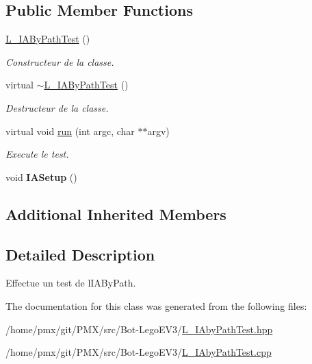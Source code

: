 \subsection*{Public Member Functions}
\begin{DoxyCompactItemize}
\item 
\mbox{\label{classL__IAByPathTest_a1ecc1a354c9182f2080409dbae4d6a03}} 
\hyperlink{classL__IAByPathTest_a1ecc1a354c9182f2080409dbae4d6a03}{L\+\_\+\+I\+A\+By\+Path\+Test} ()
\begin{DoxyCompactList}\small\item\em Constructeur de la classe. \end{DoxyCompactList}\item 
\mbox{\label{classL__IAByPathTest_a3204d390df647b41d288c7b1ef9d636c}} 
virtual \hyperlink{classL__IAByPathTest_a3204d390df647b41d288c7b1ef9d636c}{$\sim$\+L\+\_\+\+I\+A\+By\+Path\+Test} ()
\begin{DoxyCompactList}\small\item\em Destructeur de la classe. \end{DoxyCompactList}\item 
\mbox{\label{classL__IAByPathTest_af141ff239ba9f21329a1ef3a1a84a512}} 
virtual void \hyperlink{classL__IAByPathTest_af141ff239ba9f21329a1ef3a1a84a512}{run} (int argc, char $\ast$$\ast$argv)
\begin{DoxyCompactList}\small\item\em Execute le test. \end{DoxyCompactList}\item 
\mbox{\label{classL__IAByPathTest_aafdf4aab9ed707527a261ac56de1211e}} 
void {\bfseries I\+A\+Setup} ()
\end{DoxyCompactItemize}
\subsection*{Additional Inherited Members}


\subsection{Detailed Description}
Effectue un test de l\textquotesingle{}I\+A\+By\+Path. 

The documentation for this class was generated from the following files\+:\begin{DoxyCompactItemize}
\item 
/home/pmx/git/\+P\+M\+X/src/\+Bot-\/\+Lego\+E\+V3/\hyperlink{L__IAbyPathTest_8hpp}{L\+\_\+\+I\+Aby\+Path\+Test.\+hpp}\item 
/home/pmx/git/\+P\+M\+X/src/\+Bot-\/\+Lego\+E\+V3/\hyperlink{L__IAbyPathTest_8cpp}{L\+\_\+\+I\+Aby\+Path\+Test.\+cpp}\end{DoxyCompactItemize}
